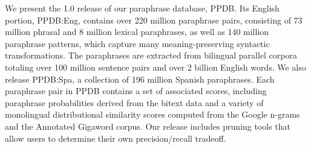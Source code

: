 We present the 1.0 release of our paraphrase database, PPDB. Its English portion, PPDB:Eng, contains over 220 million paraphrase pairs, consisting of 73
 million phrasal and 8 million lexical paraphrases, as well as 140 million
 paraphrase patterns, which capture many meaning-preserving syntactic
 transformations. The paraphrases are extracted from bilingual parallel corpora
 totaling over 100 million sentence pairs and over 2 billion English words. We
 also release PPDB:Spa, a collection of 196 million Spanish paraphrases. Each
 paraphrase pair in PPDB contains a set of associated scores, including
 paraphrase probabilities derived from the bitext data and a variety of
 monolingual distributional similarity scores computed from the Google n-grams
 and the Annotated Gigaword corpus. Our release includes pruning tools that
 allow users to determine their own precision/recall tradeoff.

